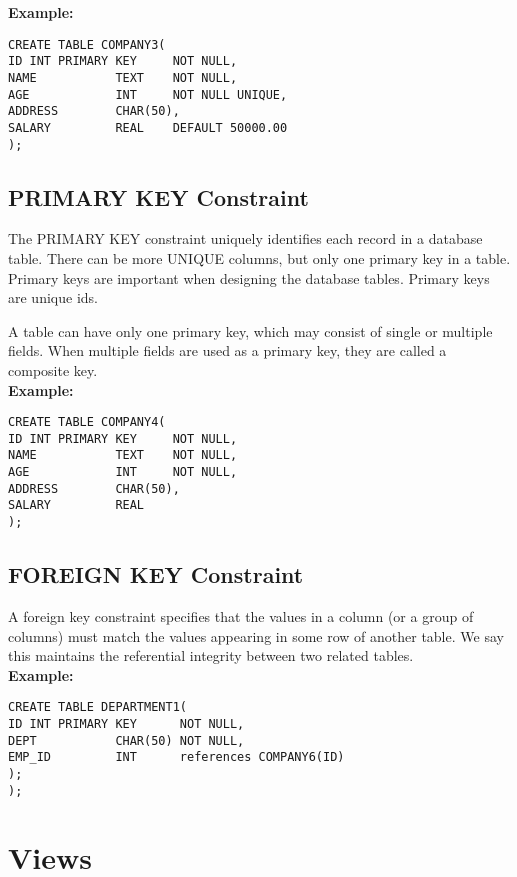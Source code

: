 \documentclass[10pt,a4paper,titlepage]{report}
\begin{document}
{\textbf{Example:}\\
\begin{verbatim}
CREATE TABLE COMPANY3(
ID INT PRIMARY KEY     NOT NULL,
NAME           TEXT    NOT NULL,
AGE            INT     NOT NULL UNIQUE,
ADDRESS        CHAR(50),
SALARY         REAL    DEFAULT 50000.00
);
\end{verbatim}

\section{PRIMARY KEY Constraint}

The PRIMARY KEY constraint uniquely identifies each record in a database table. There can be more UNIQUE columns, but only one primary key in a table. Primary keys are important when designing the database tables. Primary keys are unique ids.

A table can have only one primary key, which may consist of single or multiple fields. When multiple fields are used as a primary key, they are called a composite key.
\\

\textbf{Example:}\\
\begin{verbatim}
CREATE TABLE COMPANY4(
ID INT PRIMARY KEY     NOT NULL,
NAME           TEXT    NOT NULL,
AGE            INT     NOT NULL,
ADDRESS        CHAR(50),
SALARY         REAL
);
\end{verbatim}

\section{FOREIGN KEY Constraint}

A foreign key constraint specifies that the values in a column (or a group of columns) must match the values appearing in some row of another table. We say this maintains the referential integrity between two related tables. 
\\

\textbf{Example:}\\
\begin{verbatim}
CREATE TABLE DEPARTMENT1(
ID INT PRIMARY KEY      NOT NULL,
DEPT           CHAR(50) NOT NULL,
EMP_ID         INT      references COMPANY6(ID)
);
);
\end{verbatim}

\chapter{Views}

}
\end{document}
